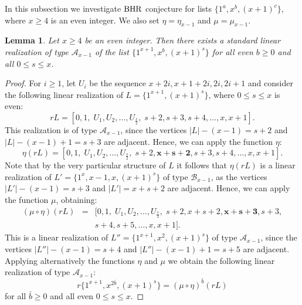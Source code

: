 \documentclass{amsart}
\newtheorem{lem}[prop]{Lemma}
\theoremstyle{definition}
\numberwithin{equation}{section}
\def\A{\mathcal{A}}
\def\B{\mathcal{B}}
\def\BHR{\mathop{\rm BHR}}
\begin{document}
In this subsection we investigate $\BHR$ conjecture for lists $\{1^a,x^b,(x+1)^c\}$, where $x\geq 4$ is an even integer.
We also set $\eta=\eta_{x-1}$ and  $\mu=\mu_{x-1}$.

\begin{lem}\label{even1}
Let $x\geq 4$ be an even integer. Then there exists a standard linear realization of type $\A_{x-1}$
of the list $\{1^{x+1}, x^b, (x+1)^s\}$ for all even $b\geq 0$  and all $0\leq  s\leq x$.
\end{lem}

\begin{proof}
For $i\geq 1$, let $U_i$ be the sequence $x+2i, x+1+2i, 2i, 2i+1$ and  consider the following linear
realization of $L=\{1^{x+1}, (x+1)^s\}$, where $0\leq s\leq x$ is even:
$$rL=[0,1,\; U_1, U_2,\ldots,U_{\frac{s}{2}},\; s+2, s+3, s+4,\ldots,x,x+1].$$
This realization is  of type $\A_{x-1}$, since the vertices $|L|-(x-1) = s+2$ and $|L|-(x-1) + 1=s+3$ are adjacent. Hence, we
can apply the function $\eta$:
$$\eta(rL) = [ 0,1,\; U_1, U_2,\ldots, U_{\frac{s}{2}},\; s+2,\bm{x+s+2}, s+3, s+4,\ldots,x,x+1  ].$$
Note that by the very particular structure of $L$ it follows that $\eta(rL)$ is a linear realization
 of $L'=\{1^{x}, x-1, x, (x+1)^s\}$ of type $\B_{x-1}$, as the vertices $|L'|-(x-1)=s+3$ and
$|L'|=x+s+2$ are adjacent.
Hence, we can apply the function $\mu$, obtaining:
$$\begin{array}{rcl}
(\mu\circ\eta)(rL) &= & [ 0,1,\; U_1, U_2,\ldots, U_{\frac{s}{2}},\; s+2,x+s+2, \bm{x+s+3}, s+3,\\
&& s+4,s+5,\ldots,x,x+1  ].
\end{array}$$
This is a linear realization of $L''=\{1^{x+1}, x^{2}, (x+1)^s\}$ of type $\A_{x-1}$, since
the vertices $|L''|-(x-1)=s+4$ and $|L''|-(x-1)+1=s+5$ are adjacent.
Applying alternatively the functions $\eta$ and $\mu$ we obtain the following linear realization of type $\A_{x-1}$:
$$r\{1^{x+1}, x^{2\bar b}, (x+1)^{s} \}=(\mu \circ \eta)^{\bar b} (rL)$$
for all $\bar b\geq 0$ and all even $0\leq s\leq x$.


\end{proof}
\end{document}
